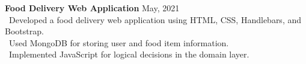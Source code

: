 {\textbf{Food Delivery Web Application} \hfill {May, 2021} \\
\hspace*{4pt} \textbullet~{Developed a food delivery web application using HTML, CSS, Handlebars, and Bootstrap.} \\
\hspace*{4pt} \textbullet~{Used MongoDB for storing user and food item information.} \\
\hspace*{4pt} \textbullet~{Implemented JavaScript for logical decisions in the domain layer.}} \\
